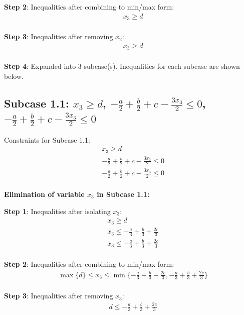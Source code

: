 \documentclass{article}
\begin{document}
\textbf{Step 2}: Inequalities after combining to min/max form:
\begin{align}
& x_{3} \geq d \\
\end{align}

\textbf{Step 3}: Inequalities after removing $x_{2}$:
\begin{align}
& x_{3} \geq d \\
\end{align}

\textbf{Step 4}: Expanded into 3 subcase(s). Inequalities for each subcase are shown below.

\subsection{Subcase 1.1: $x_{3} \geq d$, $- \frac{a}{2} + \frac{b}{2} + c - \frac{3 x_{3}}{2} \leq 0$, $- \frac{a}{2} + \frac{b}{2} + c - \frac{3 x_{3}}{2} \leq 0$}

Constraints for Subcase 1.1:
\begin{align}
& x_{3} \geq d \\
& - \frac{a}{2} + \frac{b}{2} + c - \frac{3 x_{3}}{2} \leq 0 \\
& - \frac{a}{2} + \frac{b}{2} + c - \frac{3 x_{3}}{2} \leq 0 \\
\end{align}

\textbf{Elimination of variable $x_{3}$ in Subcase 1.1:}

\textbf{Step 1}: Inequalities after isolating $x_{3}$:
\begin{align}
& x_{3} \geq d \\
& x_{3} \leq - \frac{a}{3} + \frac{b}{3} + \frac{2 c}{3} \\
& x_{3} \leq - \frac{a}{3} + \frac{b}{3} + \frac{2 c}{3} \\
\end{align}

\textbf{Step 2}: Inequalities after combining to min/max form:
\begin{align}
& \max\{d\} \leq x_{3} \leq \min\{- \frac{a}{3} + \frac{b}{3} + \frac{2 c}{3}, - \frac{a}{3} + \frac{b}{3} + \frac{2 c}{3}\} \\
\end{align}

\textbf{Step 3}: Inequalities after removing $x_{3}$:
\begin{align}
& d \leq - \frac{a}{3} + \frac{b}{3} + \frac{2 c}{3} \\
\end{align}
\end{document}
